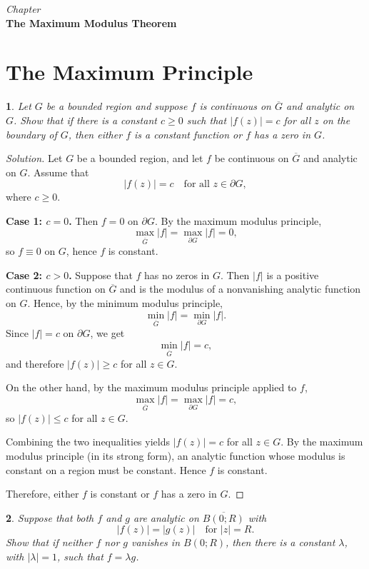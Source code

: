 \documentclass[12pt, a4paper]{report}
\newcommand{\chapter}[1]{%
  \par\vspace{2em}%
  \refstepcounter{section}%
  \begin{center}
    \textit{Chapter \thesection} \\[1.5ex]
    \textbf{#1}
  \end{center}
  \vspace{1em}%
}
\theoremstyle{spaced}
\newtheorem{exercise}{}
\newcommand{\setexercise}[1]{\setcounter{exercise}{#1-1}}
\begin{document}
\chapter{The Maximum Modulus Theorem}
\section{The Maximum Principle}
\setexercise{2}
\begin{exercise}
	Let $G$ be a bounded region and suppose $f$ is continuous on $\overline{G}$ and analytic on $G$. Show that if there is a constant $c \ge 0$ such that $|f(z)| = c$ for all $z$ on the boundary of $G$, then either $f$ is a constant function or $f$ has a zero in $G$.
\end{exercise}
\begin{proof}[Solution]
	Let $G$ be a bounded region, and let $f$ be continuous on $\overline{G}$ and analytic on $G$. Assume that
	\[
		|f(z)| = c \quad \text{for all } z \in \partial G,
	\]
	where $c \ge 0$.

	\medskip
	\noindent
	\textbf{Case 1: $c=0$.}
	Then $f=0$ on $\partial G$. By the maximum modulus principle,
	\[
		\max_{\overline{G}} |f| = \max_{\partial G} |f| = 0,
	\]
	so $f \equiv 0$ on $G$, hence $f$ is constant.

	\medskip
	\noindent
	\textbf{Case 2: $c>0$.}
	Suppose that $f$ has no zeros in $G$. Then $|f|$ is a positive continuous function on $\overline{G}$ and is the modulus of a nonvanishing analytic function on $G$. Hence, by the minimum modulus principle,
	\[
		\min_{\overline{G}} |f| = \min_{\partial G} |f|.
	\]
	Since $|f|=c$ on $\partial G$, we get
	\[
		\min_{\overline{G}} |f| = c,
	\]
	and therefore \(|f(z)| \ge c\) for all \(z\in G\).

	On the other hand, by the maximum modulus principle applied to $f$,
	\[
		\max_{\overline{G}} |f| = \max_{\partial G} |f| = c,
	\]
	so \(|f(z)| \le c\) for all \(z\in G\).

	Combining the two inequalities yields \(|f(z)|=c\) for all \(z\in G\). By the maximum modulus principle (in its strong form), an analytic function whose modulus is constant on a region must be constant. Hence $f$ is constant.

	\medskip
	\noindent
	Therefore, either $f$ is constant or $f$ has a zero in $G$.
\end{proof}



\setexercise{6}
\begin{exercise}
	Suppose that both $f$ and $g$ are analytic on $\overline{B(0;R)}$ with
	\[
		|f(z)| = |g(z)| \quad \text{for } |z| = R.
	\]
	Show that if neither $f$ nor $g$ vanishes in $B(0;R)$, then there is a constant $\lambda$, with $|\lambda| = 1$, such that $f = \lambda g$.
\end{exercise}
\end{document}
